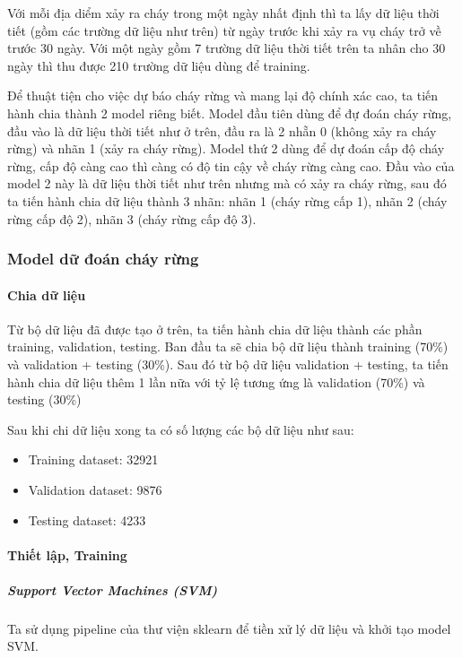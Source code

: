 \documentclass{article}
\begin{document}
Với mỗi địa diểm xảy ra cháy trong một ngày nhất định thì ta lấy dữ liệu thời tiết (gồm các trường dữ liệu như trên) từ ngày trước khi xảy ra vụ cháy trở về trước 30 ngày. Với một ngày gồm 7 trường dữ liệu thời tiết trên ta nhân cho 30 ngày thì thu được 210 trường dữ liệu dùng để training.

Để thuật tiện cho việc dự báo cháy rừng và mang lại độ chính xác cao, ta tiến hành chia thành 2 model riêng biết. Model đầu tiên dùng để đự đoán cháy rừng, đầu vào là dữ liệu thời tiết như ở trên, đầu ra là 2 nhẵn 0 (không xảy ra cháy rừng) và nhãn 1 (xảy ra cháy rừng). Model thứ 2 dùng để dự đoán cấp độ cháy rừng, cấp độ càng cao thì càng có độ tin cậy về cháy rừng càng cao. Đầu vào của model 2 này là dữ liệu thời tiết như trên nhưng mà có xảy ra cháy rừng, sau đó ta tiến hành chia dữ liệu thành 3 nhãn: nhãn 1 (cháy rừng cấp 1), nhãn 2 (cháy rừng cấp độ 2), nhãn 3 (cháy rừng cấp độ 3).

\subsubsection{Model dữ đoán cháy rừng}
\paragraph{Chia dữ liệu}


Từ bộ dữ liệu đã được tạo ở trên, ta tiến hành chia dữ liệu thành các phần training, validation, testing. Ban đầu ta sẽ chia bộ dữ liệu thành training (70\%) và validation + testing (30\%). Sau đó từ bộ dữ liệu validation + testing, ta tiến hành chia dữ liệu thêm 1 lần nữa với tỷ lệ tương ứng là validation (70\%) và testing (30\%)

Sau khi chi dữ liệu xong ta có số lượng các bộ dữ liệu như sau:

\begin{itemize}
	\item Training dataset: 32921
	\item Validation dataset: 9876
	\item Testing dataset: 4233
\end{itemize}

\paragraph{Thiết lập, Training}
\subparagraph{Support Vector Machines (SVM)}


Ta sử dụng pipeline của thư viện sklearn để tiền xử lý dữ liệu và khởi tạo model SVM.
\end{document}
